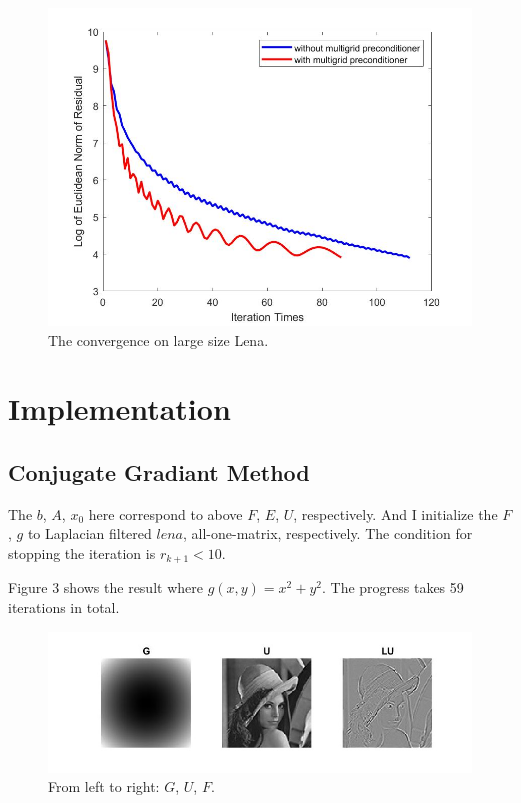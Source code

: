 \documentclass{article}
\begin{document}
\begin{figure}[H]
   \centering
   \includegraphics[scale=0.3]{convergence_lenal.jpg}
   \caption{The convergence on large size Lena.}
\end{figure}

\section{Implementation}
\subsection{Conjugate Gradiant Method}
The $b$, $A$, $x_0$ here correspond to above $F$, $E$, $U$, respectively. And I initialize the $F$, $ g$ to Laplacian filtered $\textit{lena}$, all-one-matrix, respectively. The condition for stopping the iteration is $r_{k+1}<10$.

Figure 3 shows the result where $g(x,y)=x^2+y^2$. The progress takes 59 iterations in total.
\begin{figure}[H]
   \centering
   \includegraphics[scale=0.8]{cg.jpg}
   \caption{From left to right: $G$, $U$, $F$.}
\end{figure}
\end{document}
